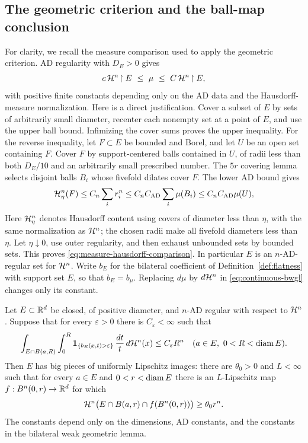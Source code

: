 \subsection{The geometric criterion and the ball-map conclusion}

For clarity, we recall the measure comparison used to apply the
geometric criterion.  AD regularity with $D_E>0$ gives
\begin{equation}\label{eq:measure-hausdorff-comparison}
 c\,\mathcal H^n\!\restriction E\ \leq\ \mu\ \leq\
 C\,\mathcal H^n\!\restriction E,
\end{equation}
with positive finite constants depending only on the AD data and the
Hausdorff-measure normalization.  Here is a direct justification.
Cover a subset of $E$ by sets of arbitrarily small diameter, recenter
each nonempty set at a point of $E$, and use the upper ball bound.
Infimizing the cover sums proves the upper inequality.  For the reverse
inequality, let $F\subset E$ be bounded and Borel, and let $U$ be an open
set containing $F$.  Cover $F$ by support-centered balls contained in
$U$, of radii less than both $D_E/10$ and an arbitrarily small prescribed
number.  The $5r$ covering lemma selects disjoint balls $B_i$ whose
fivefold dilates cover $F$.  The lower AD bound gives
\[
 \mathcal H^n_\eta(F)\leq C_n\sum_i r_i^n
      \leq C_nC_{\rm AD}\sum_i\mu(B_i)
      \leq C_nC_{\rm AD}\mu(U),
\]
Here $\mathcal H^n_\eta$ denotes Hausdorff content using covers of diameter
less than $\eta$, with the same normalization as $\mathcal H^n$; the chosen
radii make all fivefold diameters less than $\eta$.
Let $\eta\downarrow0$, use outer regularity, and then exhaust unbounded
sets by bounded sets.  This proves \eqref{eq:measure-hausdorff-comparison}.
In particular $E$ is an $n$-AD-regular set for $\mathcal H^n$.  Write $b_E$ for
the bilateral coefficient of Definition~\ref{def:flatness} with support
set $E$, so that $b_E=b_\mu$.  Replacing
$d\mu$ by $d\mathcal H^n$ in \eqref{eq:continuous-bwgl} changes only its constant.

\begin{theorem}\label{thm:bwgl}
Let $E\subset\mathbb R^d$ be closed, of positive diameter, and $n$-AD regular
with respect to $\mathcal H^n$.  Suppose that for every $\varepsilon>0$ there is
$C_\varepsilon<\infty$ such that
\[
 \int_{E\cap B(a,R)}\int_0^R
   \mathbf1_{\{b_E(x,t)>\varepsilon\}}\,\frac{dt}{t}\,d\mathcal H^n(x)
 \leq C_\varepsilon R^n
 \quad(a\in E,\ 0<R<\operatorname{diam} E).
\]
Then $E$ has big pieces of uniformly Lipschitz images: there are
$\theta_0>0$ and $L<\infty$ such that for every $a\in E$ and
$0<r<\operatorname{diam} E$ there is an $L$-Lipschitz map
$f:B^n(0,r)\to\mathbb R^d$ for which
\[
 \mathcal H^n\bigl(E\cap B(a,r)\cap f(B^n(0,r))\bigr)\geq\theta_0r^n.
\]
The constants depend only on the dimensions, AD constants, and the
constants in the bilateral weak geometric lemma.
\end{theorem}

